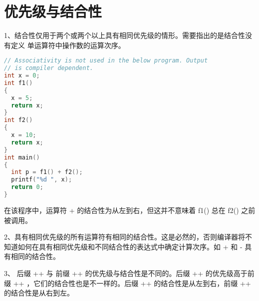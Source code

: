 \section{优先级与结合性}

\begin{frame}[fragile]\ft{\secname}
  1、结合性仅用于两个或两个以上具有相同优先级的情形。需要指出的是结合性没有定义  单运算符中操作数的运算次序。
\end{frame}

\begin{frame}\ft{\secname}  
\begin{lstlisting}[language=c,backgroundcolor=\color{red!10}]
// Associativity is not used in the below program. Output 
// is compiler dependent.
int x = 0; 
int f1()
{
  x = 5;
  return x;
} 
int f2()
{
  x = 10;
  return x;
}
int main()
{
  int p = f1() + f2();
  printf("%d ", x);
  return 0;
}
\end{lstlisting}
\end{frame}

\begin{frame}[fragile]\ft{\secname}
  在该程序中，运算符 {\tf +} 的结合性为从左到右，但这并不意味着 {\tf f1()} 总在 {\tf f2()} 之前被调用。
\end{frame}

\begin{frame}[fragile]\ft{\secname}  
  2、具有相同优先级的所有运算符有相同的结合性。这是必然的，否则编译器将不知道如何在具有相同优先级和不同结合性的表达式中确定计算次序。如 {\tf +} 和 {\tf -} 具有相同的结合性。
\end{frame}

\begin{frame}[fragile]\ft{\secname}  
3、 后缀 {\tf ++} 与 前缀 {\tf ++} 的优先级与结合性是不同的。后缀 {\tf ++} 的优先级高于前缀 {\tf ++} ，它们的结合性也是不一样的。后缀 {\tf ++} 的结合性是从左到右，前缀 {\tf ++} 的结合性是从右到左。
\end{frame}

